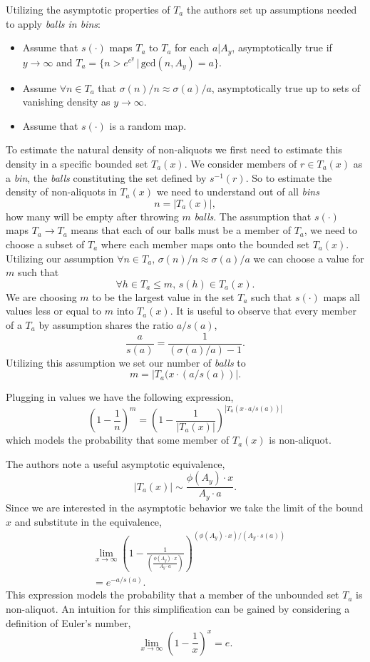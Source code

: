 \documentclass{article}
\theoremstyle{definition}
\begin{document}
Utilizing the asymptotic properties of $T_a$ the authors set up assumptions needed to apply \textit{balls in bins}:
\begin{itemize}
    \item Assume that $s(\cdot)$ maps $T_a$ to $T_a$ for each $a | A_y$, asymptotically true if $y \to \infty$ and $T_a = \{n > e^{e^y} \,|\, \text{gcd}(n, A_y) = a\}$.
    \item Assume $\forall n \in T_a $ that $\sigma(n)/n \approx \sigma(a)/a $, asymptotically true up to sets of vanishing density as $y \to \infty$.
    \item Assume that $s(\cdot)$ is a random map.
\end{itemize}

To estimate the natural density of non-aliquots we first need to estimate this density in a specific bounded set $T_a(x)$. We consider members of $r \in T_a(x)$ as a \textit{bin}, the \textit{balls} constituting the set defined by $s^{-1}(r)$. So to estimate the density of non-aliquots in $T_a(x)$ we need to understand out of all \textit{bins}
$$n = |T_a(x)|,$$
how many will be empty after throwing $m$ \textit{balls}. The assumption that $s(\cdot)$ maps $T_a \to T_a$ means that each of our balls must be a member of $T_a$, we need to choose a subset of $T_a$ where each member maps onto the bounded set $T_a(x)$. Utilizing our assumption $\forall n \in T_a,\, \sigma(n)/n \approx \sigma(a)/a$ we can choose a value for $m$ such that
$$\forall h \in T_a \leq m,\, s(h) \in T_a(x).$$
We are choosing $m$ to be the largest value in the set $T_a$ such that $s(\cdot)$ maps all values less or equal to $m$ into $T_a(x)$. It is useful to observe that every member of a $T_a$ by assumption shares the ratio $a / s(a)$,
$$\frac{a}{s(a)} = \frac{1}{(\sigma(a)/a)-1}.$$
Utilizing this assumption we set our number of \textit{balls} to
$$m = |T_a(x \cdot (a/s(a))|.$$

Plugging in values we have the following expression,
$$\left(1-\frac{1}{n}\right)^m = \left(1-\frac{1}{|T_a(x)|}\right)^{|T_a(x\cdot a/s(a))|} $$
which models the probability that some member of $T_a(x)$ is non-aliquot.

The authors note a useful asymptotic equivalence,
$$|T_a(x)|  \sim  \frac{\phi(A_y) \cdot x}{ A_y \cdot a}.$$
Since we are interested in the asymptotic behavior we take the limit of the bound $x$ and substitute in the equivalence,
\begin{align*}
     & \lim_{x \to \infty}\left(1-\frac{1}{\left(\frac{\phi(A_y) \cdot x}{ A_y \cdot a}\right)}\right)^{(\phi(A_y) \cdot x)/( A_y \cdot s(a))} \\
     & = e^{-a/s(a)}.
\end{align*}
This expression models the probability that a member of the unbounded set $T_a$ is non-aliquot. An intuition for this simplification can be gained by considering a definition of Euler's number,
$$\lim_{x \to \infty} (1- \frac{1}{x})^x = e.$$
\end{document}
